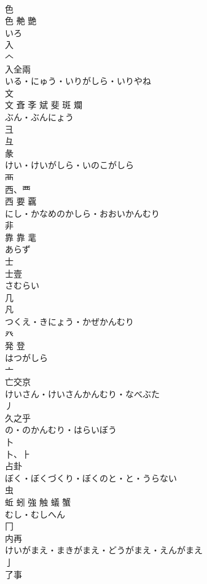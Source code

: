 \documentclass[8pt]{extreport}
\begin{document}
\begin{CJK}{UTF8}{min}
\\	色	
\\	色 艴 艷	
\\	いろ	
\\	入	
\\	𠆢 
\\	入全兩	
\\	いる・にゅう・いりがしら・いりやね	
\\	文	
\\	文 斊 斈 斌 斐 斑 斕	
\\	ぶん・ぶんにょう	
\\	彐	
\\	彑 
\\	彖	
\\	けい・けいがしら・いのこがしら	
\\	襾	
\\	西、覀 
\\	西 要 覊	
\\	にし・かなめのかしら・おおいかんむり	
\\	非	
\\	靠 靠 靟	
\\	あらず	
\\	士	
\\	士壹	
\\	さむらい	
\\	几	
\\	凡	
\\	つくえ・きにょう・かぜかんむり	
\\	癶	
\\	発 登	
\\	はつがしら	
\\	亠	
\\	亡交京	
\\	けいさん・けいさんかんむり・なべぶた	
\\	丿	
\\	久之乎	
\\	の・のかんむり・はらいぼう	
\\	卜	
\\	⼘、⺊ 
\\	占卦	
\\	ぼく・ぼくづくり・ぼくのと・と・うらない	
\\	虫	
\\	蚯 蚓 強 触 蟻 蟹	
\\	むし・むしへん	
\\	冂	
\\	内再	
\\	けいがまえ・まきがまえ・どうがまえ・えんがまえ	
\\	亅	
\\	了事	

\end{CJK}
\end{document}

